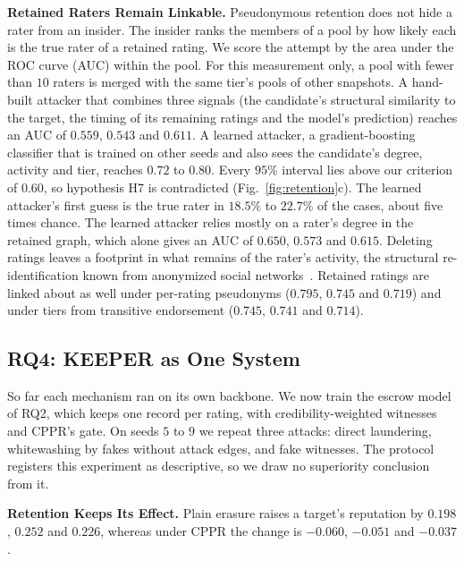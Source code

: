 \documentclass[lettersize,journal]{IEEEtran}
\begin{document}
\smallskip\noindent\textbf{Retained Raters Remain Linkable.}
Pseudonymous retention does not hide a rater from an insider.
The insider ranks the members of a pool by how likely each is the true rater of a retained rating. We score the attempt by the area under the ROC curve (AUC) within the pool. For this measurement only, a pool with fewer than $10$ raters is merged with the same tier's pools of other snapshots.
A hand-built attacker that combines three signals (the candidate's structural similarity to the target, the timing of its remaining ratings and the model's prediction) reaches an AUC of $0.559$, $0.543$ and $0.611$.
A learned attacker, a gradient-boosting classifier that is trained on other seeds and also sees the candidate's degree, activity and tier, reaches $0.72$ to $0.80$. Every $95\%$ interval lies above our criterion of $0.60$, so hypothesis H7 is contradicted (Fig.~\ref{fig:retention}c).
The learned attacker's first guess is the true rater in $18.5\%$ to $22.7\%$ of the cases, about five times chance.
The learned attacker relies mostly on a rater's degree in the retained graph, which alone gives an AUC of $0.650$, $0.573$ and $0.615$. Deleting ratings leaves a footprint in what remains of the rater's activity, the structural re-identification known from anonymized social networks~\cite{narayanan2009deanonymizing}.
Retained ratings are linked about as well under per-rating pseudonyms ($0.795$, $0.745$ and $0.719$) and under tiers from transitive endorsement ($0.745$, $0.741$ and $0.714$).

\subsection{RQ4: KEEPER as One System}
\label{subsec:results_combined}

So far each mechanism ran on its own backbone.
We now train the escrow model of RQ2, which keeps one record per rating, with credibility-weighted witnesses and CPPR's gate. On seeds $5$ to $9$ we repeat three attacks: direct laundering, whitewashing by fakes without attack edges, and fake witnesses.
The protocol registers this experiment as descriptive, so we draw no superiority conclusion from it.

\smallskip\noindent\textbf{Retention Keeps Its Effect.}
Plain erasure raises a target's reputation by $0.198$, $0.252$ and $0.226$, whereas under CPPR the change is $-0.060$, $-0.051$ and $-0.037$.
\end{document}
